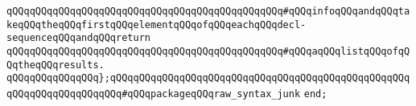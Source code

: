 \verb|qQQqqQQqqQQqqQQqqQQqqQQqqQQqqQQqqQQqqQQqqQQqqQQq#qQQqinfoqQQqandqQQqtakeqQQqtheqQQqfirstqQQqelementqQQqofqQQqeachqQQqdecl-sequenceqQQqandqQQqreturn|\newline
\verb|qQQqqQQqqQQqqQQqqQQqqQQqqQQqqQQqqQQqqQQqqQQqqQQq#qQQqaqQQqlistqQQqofqQQqtheqQQqresults.|\newline
\verb|qQQqqQQqqQQqqQQq};qQQqqQQqqQQqqQQqqQQqqQQqqQQqqQQqqQQqqQQqqQQqqQQqqQQqqQQqqQQqqQQqqQQqqQQq#qQQqpackageqQQqraw_syntax_junk|\newline
\verb|end;|\newline
\newline
\newline

